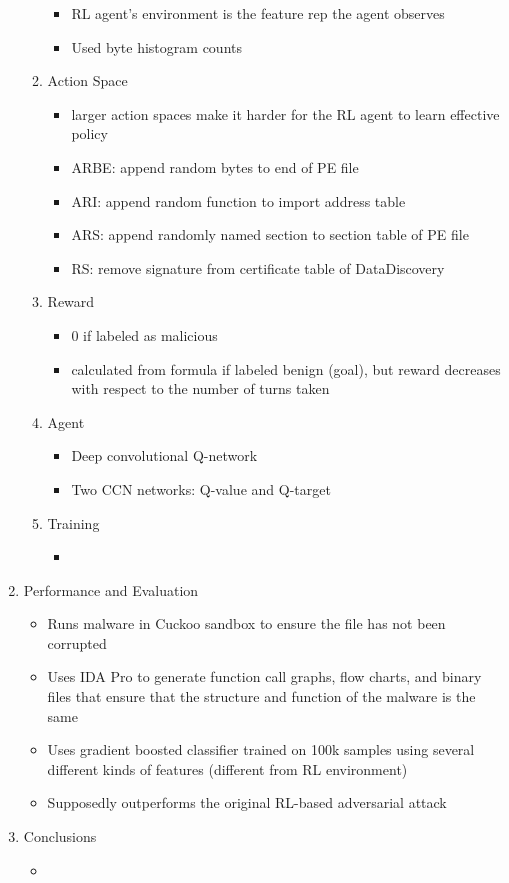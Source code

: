 \documentclass{article}
\begin{document}
\begin{enumerate}
\begin{enumerate}
\begin{itemize}
			\item RL agent's environment is the feature rep the agent observes
			\item Used byte histogram counts
		\end{itemize}
		\item Action Space
		\begin{itemize}
			\item larger action spaces make it harder for the RL agent to learn effective policy
			\item ARBE: append random bytes to end of PE file
			\item ARI: append random function to import address table
			\item ARS: append randomly named section to section table of PE file
			\item RS: remove signature from certificate table of DataDiscovery
		\end{itemize}
		\item Reward
		\begin{itemize}
			\item 0 if labeled as malicious
			\item calculated from formula if labeled benign (goal), but reward decreases with respect to the number of turns taken
		\end{itemize}
		\item Agent
		\begin{itemize}
			\item Deep convolutional Q-network
			\item Two CCN networks: Q-value and Q-target
		\end{itemize}
		\item Training
		\begin{itemize}
			\item 
		\end{itemize}
	\end{enumerate}
	\item Performance and Evaluation
	\begin{itemize}
		\item Runs malware in Cuckoo sandbox to ensure the file has not been corrupted
		\item Uses IDA Pro to generate function call graphs, flow charts, and binary files that ensure that the structure and function of the malware is the same
		\item Uses gradient boosted classifier trained on 100k samples using several different kinds of features (different from RL environment)
		\item Supposedly outperforms the original RL-based adversarial attack
	\end{itemize}
	\item Conclusions
	\begin{itemize}
		\item 
	\end{itemize}
\end{enumerate}
\pagebreak
\end{document}
